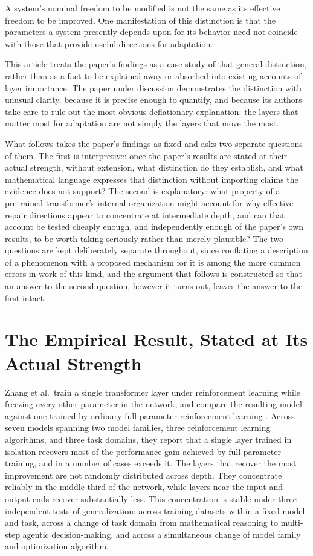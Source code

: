 \documentclass[11pt]{article}
\begin{document}
A system's nominal freedom to be modified is not the same as its effective freedom to be improved. One manifestation of this distinction is that the parameters a system presently depends upon for its behavior need not coincide with those that provide useful directions for adaptation.

This article treats the paper's findings as a case study of that general distinction, rather than as a fact to be explained away or absorbed into existing accounts of layer importance. The paper under discussion demonstrates the distinction with unusual clarity, because it is precise enough to quantify, and because its authors take care to rule out the most obvious deflationary explanation: the layers that matter most for adaptation are not simply the layers that move the most.

What follows takes the paper's findings as fixed and asks two separate questions of them. The first is interpretive: once the paper's results are stated at their actual strength, without extension, what distinction do they establish, and what mathematical language expresses that distinction without importing claims the evidence does not support? The second is explanatory: what property of a pretrained transformer's internal organization might account for why effective repair directions appear to concentrate at intermediate depth, and can that account be tested cheaply enough, and independently enough of the paper's own results, to be worth taking seriously rather than merely plausible? The two questions are kept deliberately separate throughout, since conflating a description of a phenomenon with a proposed mechanism for it is among the more common errors in work of this kind, and the argument that follows is constructed so that an answer to the second question, however it turns out, leaves the answer to the first intact.

\section{The Empirical Result, Stated at Its Actual Strength}

Zhang et al.\ train a single transformer layer under reinforcement learning while freezing every other parameter in the network, and compare the resulting model against one trained by ordinary full-parameter reinforcement learning \cite{zhang2026onelayer}. Across seven models spanning two model families, three reinforcement learning algorithms, and three task domains, they report that a single layer trained in isolation recovers most of the performance gain achieved by full-parameter training, and in a number of cases exceeds it. The layers that recover the most improvement are not randomly distributed across depth. They concentrate reliably in the middle third of the network, while layers near the input and output ends recover substantially less. This concentration is stable under three independent tests of generalization: across training datasets within a fixed model and task, across a change of task domain from mathematical reasoning to multi-step agentic decision-making, and across a simultaneous change of model family and optimization algorithm.
\end{document}
